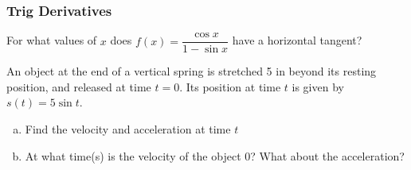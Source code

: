 \documentclass[notes]{subfiles}
\begin{document}
	\subsubsection*{Trig Derivatives}
		\begin{ex}
			For what values of $x$ does $f(x) = \dfrac{\cos x}{1-\sin x}$ have a horizontal tangent?
		\end{ex}
			\newpage

		\begin{ex}
			An object at the end of a vertical spring is stretched 5 in beyond its resting position, and released at time $t = 0$.  Its position at time $t$ is given by $s(t) = 5\sin t$.
			\begin{enumerate}[(a)]
				\item Find the velocity and acceleration at time $t$
					
				\item At what time(s) is the velocity of the object 0?  What about the acceleration?
					
			\end{enumerate}
		\end{ex}
\end{document}
